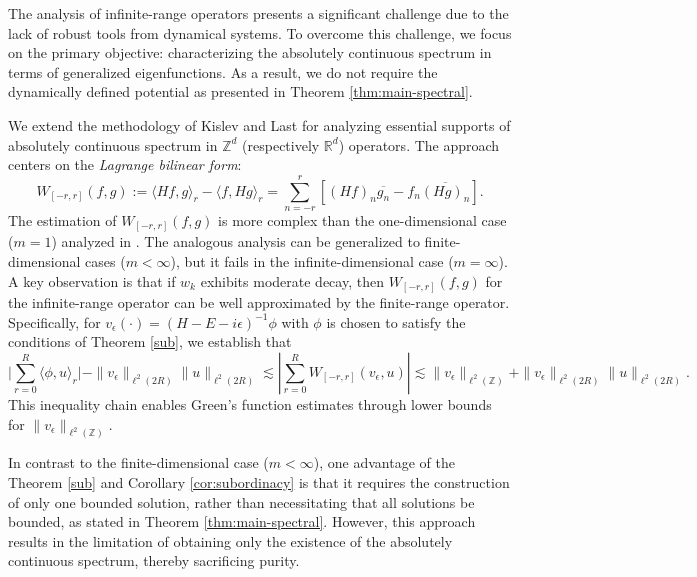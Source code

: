 \documentclass[11pt]{amsart}
\theoremstyle{remark}
\theoremstyle{definition}
\begin{document}
The analysis of infinite-range operators presents a significant challenge due to the lack of robust tools from dynamical systems. To overcome this challenge,
 we  focus on the primary objective: characterizing the absolutely continuous spectrum in terms of generalized eigenfunctions. As a result, we do not require the dynamically defined potential as presented in Theorem \ref{thm:main-spectral}.

We extend the methodology of Kislev and Last \cite{KL1} for analyzing essential supports of absolutely continuous spectrum in $\mathbb{Z}^d$ (respectively $\mathbb{R}^d$) operators. The approach centers on the \emph{Lagrange bilinear form}:
\begin{equation*}\label{eq:lagrange-form}
    W_{[-r,r]}(f,g) := \langle Hf, g \rangle_r - \langle f, Hg \rangle_r = \sum_{n=-r}^{r} \left[ (Hf)_n \overline{g_n} - f_n \overline{(Hg)_n} \right].
\end{equation*}
The estimation of $ W_{[-r,r]}(f,g) $ is more complex than the one-dimensional case ($ m=1 $) analyzed in \cite{KL1}. The analogous analysis can be generalized to finite-dimensional cases ($ m < \infty $), but it fails in the infinite-dimensional case ($ m = \infty $). A key observation is that if $ w_k $ exhibits moderate decay, then $ W_{[-r,r]}(f,g) $ for the infinite-range operator can be well approximated by the finite-range operator. Specifically,
for $v_\epsilon(\cdot) = (H - E - i\epsilon)^{-1}\phi$ with $\phi$ is chosen to satisfy the conditions of Theorem  \ref{sub}, we establish that
\begin{equation*}
   \bigg|\sum_{r=0}^R \langle \phi,u\rangle_r\bigg|-  \|v_\epsilon\|_{\ell^2({2R})} \|u\|_{\ell^2({2R})} \lesssim \left|\sum_{r=0}^R W_{[-r,r]}(v_\epsilon, u)\right| \lesssim \|v_\epsilon\|_{\ell^2(\mathbb{Z})} + \|v_\epsilon\|_{\ell^2({2R})} \|u\|_{\ell^2({2R})}.
\end{equation*}
This inequality chain enables Green's function estimates  through lower bounds for $\|v_\epsilon\|_{\ell^2(\mathbb{Z})}$.

In contrast to the finite-dimensional case ($m<\infty$), one advantage of the Theorem \ref{sub} and Corollary \ref{cor:subordinacy} is that it requires the construction of only one bounded solution, rather than necessitating that all solutions be bounded, as stated in Theorem \ref{thm:main-spectral}. However, this approach results in the limitation of obtaining only the existence of the absolutely continuous spectrum, thereby sacrificing purity.
\end{document}
